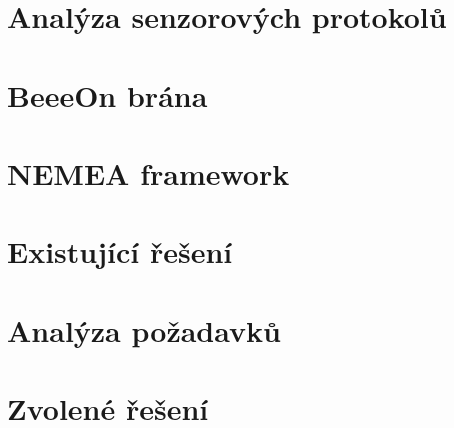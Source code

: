  \section{Analýza senzorových protokolů}
 \section{BeeeOn brána}
 \section{NEMEA framework}
 \section{Existující řešení}
 \section{Analýza požadavků}
 \section{Zvolené řešení}
